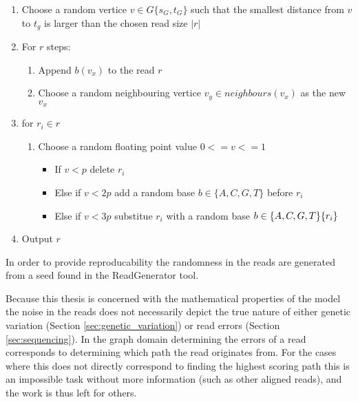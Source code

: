 \documentclass[thesis.tex]{subfiles}
\begin{document}
\begin{enumerate}
  \item Choose a random vertice $v \in G\{s_G, t_G\}$ such that the smallest distance from $v$ to $t_g$ is larger than the chosen read size $|r|$
  \item For $r$ steps:
  \begin{enumerate}
    \item Append $b(v_x)$ to the read $r$
    \item Choose a random neighbouring vertice $v_y \in neighbours(v_x)$ as the new $v_x$
  \end{enumerate}
  \item for $r_i \in r$
  \begin{enumerate}
    \item Choose a random floating point value $0<=v<=1$
    \begin{itemize}
      \item If $v<p$ delete $r_i$
      \item Else if $v<2p$ add a random base $b \in \{A, C, G, T\}$ before $r_i$
      \item Else if $v<3p$ substitue $r_i$ with a random base $b \in \{A, C, G, T\} \\ \{r_i\}$
    \end{itemize}
  \end{enumerate}
  \item Output $r$
\end{enumerate}
In order to provide reproducability the randomness in the reads are generated from a seed found in the ReadGenerator tool.\\
\par\noindent
Because this thesis is concerned with the mathematical properties of the model the noise in the reads does not necessarily depict the true nature of either genetic variation (Section \ref{sec:genetic_variation}) or read errors (Section \ref{sec:sequencing}). In the graph domain determining the errors of a read corresponds to determining which path the read originates from. For the cases where this does not directly correspond to finding the highest scoring path this is an impossible task without more information (such as other aligned reads), and the work is thus left for others. 
\end{document}
